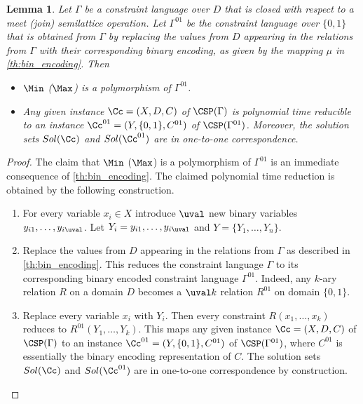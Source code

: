 \documentclass[11pt]{article}
\newtheorem{lemma}[theorem]{Lemma}
\begin{document}
\begin{lemma}\label{th:reduction_csp}
Let $\Gamma$ be a constraint language over $D$ that is closed with respect to a meet (join) semilattice operation. Let $\Gamma^{01}$ be the constraint language over $\{0,1\}$ that is obtained from $\Gamma$ by replacing the values from $D$ appearing in the relations from $\Gamma$ with their corresponding binary encoding, as given by the mapping $\mu$ in \cref{th:bin_encoding}. Then 
\begin{itemize}
    \item $\Min$ ($\Max$) is a polymorphism of $\Gamma^{01}$.
    \item Any given instance $\Cc=(X,D,C)$ of $\CSP(\Gamma)$ is polynomial time reducible to an instance $\Cc^{01}=(Y,\{0,1\},C^{01})$ of $\CSP(\Gamma^{01})$. Moreover, the solution sets $Sol(\Cc)$ and $Sol(\Cc^{01})$ are in one-to-one correspondence.  
\end{itemize} 
\end{lemma}
\begin{proof}
The claim that $\Min$ ($\Max$) is a polymorphism of $\Gamma^{01}$ is an immediate consequence of \cref{th:bin_encoding}. The claimed polynomial time reduction is obtained by the following construction.
\begin{enumerate} 
    \item For every variable $x_i\in X$ introduce $\uval$ new binary variables $y_{i1},\ldots, y_{i\uval}$. Let $Y_i=y_{i1},\ldots, y_{i\uval}$ and $Y=\{Y_1,\ldots, Y_n\}$.
    \item Replace the values from $D$ appearing in the relations from $\Gamma$ as described in \cref{th:bin_encoding}. This reduces the constraint language $\Gamma$ to its corresponding binary encoded constraint language $\Gamma^{01}$. 
    Indeed, any $k$-ary relation $R$ on a domain $D$ becomes a $\uval k$ relation $R^{01}$ on domain $\{0,1\}$.
    \item Replace every variable $x_i$ with $Y_i$. Then every constraint $R(x_1,\ldots, x_k)$ reduces to $R^{01}(Y_1,\ldots, Y_k)$.
    This maps any given instance $\Cc=(X,D,C)$ of $\CSP(\Gamma)$ to an instance $\Cc^{01}=(Y,\{0,1\},C^{01})$ of $\CSP(\Gamma^{01})$, where $C^{01}$ is essentially the binary encoding representation of $C$. The solution sets $Sol(\Cc)$ and $Sol(\Cc^{01})$ are in one-to-one correspondence by construction. 
\end{enumerate}    
\end{proof}
%
\end{document}
